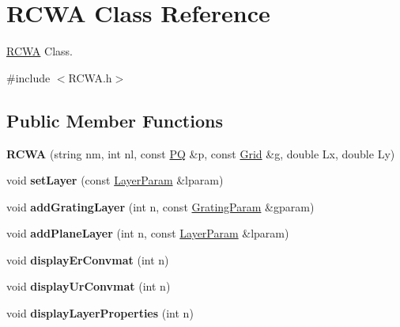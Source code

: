 \hypertarget{class_r_c_w_a}{}\section{R\+C\+WA Class Reference}
\label{class_r_c_w_a}


\hyperlink{class_r_c_w_a}{R\+C\+WA} Class.  




{\ttfamily \#include $<$R\+C\+W\+A.\+h$>$}

\subsection*{Public Member Functions}
\begin{DoxyCompactItemize}
\item 
{\bfseries R\+C\+WA} (string nm, int nl, const \hyperlink{structpq}{PQ} \&p, const \hyperlink{structg}{Grid} \&\hyperlink{structg}{g}, double Lx, double Ly)\hypertarget{class_r_c_w_a_a88d6c494e422e168893b245f255d5d61}{}\label{class_r_c_w_a_a88d6c494e422e168893b245f255d5d61}

\item 
void {\bfseries set\+Layer} (const \hyperlink{structinput1}{Layer\+Param} \&lparam)\hypertarget{class_r_c_w_a_ac9d27481627ed8a0f9f5039da4c26647}{}\label{class_r_c_w_a_ac9d27481627ed8a0f9f5039da4c26647}

\item 
void {\bfseries add\+Grating\+Layer} (int n, const \hyperlink{structinput}{Grating\+Param} \&gparam)\hypertarget{class_r_c_w_a_a24ab71923029b298d78a3f013ae2ee22}{}\label{class_r_c_w_a_a24ab71923029b298d78a3f013ae2ee22}

\item 
void {\bfseries add\+Plane\+Layer} (int n, const \hyperlink{structinput1}{Layer\+Param} \&lparam)\hypertarget{class_r_c_w_a_a9cc42f20df1a515d3ad6a07de6a9a1f0}{}\label{class_r_c_w_a_a9cc42f20df1a515d3ad6a07de6a9a1f0}

\item 
void {\bfseries display\+Er\+Convmat} (int n)\hypertarget{class_r_c_w_a_a41874a0fc4a91b70b331e96573242b3c}{}\label{class_r_c_w_a_a41874a0fc4a91b70b331e96573242b3c}

\item 
void {\bfseries display\+Ur\+Convmat} (int n)\hypertarget{class_r_c_w_a_aee373d8706d6244b94f379de51a52809}{}\label{class_r_c_w_a_aee373d8706d6244b94f379de51a52809}

\item 
void {\bfseries display\+Layer\+Properties} (int n)\hypertarget{class_r_c_w_a_a3618bdeedb864d5dc49f5b8faf89c68a}{}\label{class_r_c_w_a_a3618bdeedb864d5dc49f5b8faf89c68a}


\end{DoxyCompactItemize}
